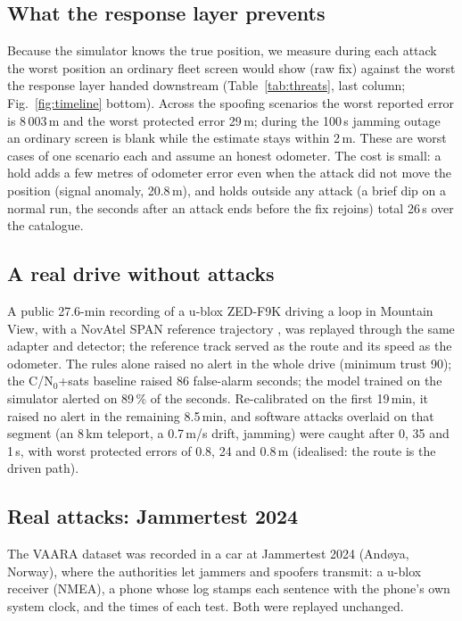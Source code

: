 \documentclass[conference]{IEEEtran}
\begin{document}
\subsection{What the response layer prevents}
Because the simulator knows the true position, we measure during each attack the worst position an ordinary fleet screen would show (raw fix) against the worst the response layer handed downstream (Table~\ref{tab:threats}, last column; Fig.~\ref{fig:timeline} bottom). Across the spoofing scenarios the worst reported error is 8\,003\,m and the worst protected error 29\,m; during the 100\,s jamming outage an ordinary screen is blank while the estimate stays within 2\,m. These are worst cases of one scenario each and assume an honest odometer. The cost is small: a hold adds a few metres of odometer error even when the attack did not move the position (signal anomaly, 20.8\,m), and holds outside any attack (a brief dip on a normal run, the seconds after an attack ends before the fix rejoins) total 26\,s over the catalogue.


\subsection{A real drive without attacks}\label{sec:real}
A public 27.6-min recording of a u-blox ZED-F9K driving a loop in Mountain View, with a NovAtel SPAN reference trajectory \cite{gpstools}, was replayed through the same adapter and detector; the reference track served as the route and its speed as the odometer. The rules alone raised no alert in the whole drive (minimum trust 90); the C/N$_0$+sats baseline raised 86 false-alarm seconds; the model trained on the simulator alerted on 89\,\% of the seconds. Re-calibrated on the first 19\,min, it raised no alert in the remaining 8.5\,min, and software attacks overlaid on that segment (an 8\,km teleport, a 0.7\,m/s drift, jamming) were caught after 0, 35 and 1\,s, with worst protected errors of 0.8, 24 and 0.8\,m (idealised: the route is the driven path).

\subsection{Real attacks: Jammertest 2024}\label{sec:attacks}
The VAARA dataset \cite{vaara} was recorded in a car at Jammertest 2024 (And\o ya, Norway), where the authorities let jammers and spoofers transmit: a u-blox receiver (NMEA), a phone whose log stamps each sentence with the phone's own system clock, and the times of each test. Both were replayed unchanged.
\end{document}
